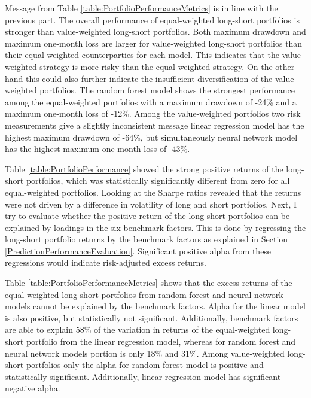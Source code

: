 \documentclass[12pt]{article}
\begin{document}
Message from Table \ref{table:PortfolioPerformanceMetrics} is in line with the previous part. The overall performance of equal-weighted long-short portfolios is stronger than value-weighted long-short portfolios. Both maximum drawdown and maximum one-month loss are larger for value-weighted long-short portfolios than their equal-weighted counterparties for each model. This indicates that the value-weighted strategy is more risky than the equal-weighted strategy. On the other hand this could also further indicate the insufficient diversification of the value-weighted portfolios. The random forest model shows the strongest performance among the equal-weighted portfolios with a maximum drawdown of -24\% and a maximum one-month loss of -12\%. Among the value-weighted portfolios two risk measurements give a slightly inconsistent message linear regression model has the highest maximum drawdown of -64\%, but simultaneously neural network model has the highest maximum one-month loss of -43\%. \par

Table \ref{table:PortfolioPerformance} showed the strong positive returns of the long-short portfolios, which was statistically significantly different from zero for all equal-weighted portfolios. Looking at the Sharpe ratios revealed that the returns were not driven by a difference in volatility of long and short portfolios. Next, I try to evaluate whether the positive return of the long-short portfolios can be explained by loadings in the six benchmark factors. This is done by regressing the long-short portfolio returns by the benchmark factors as explained in Section \ref{PredictionPerformanceEvaluation}. Significant positive alpha from these regressions would indicate risk-adjusted excess returns. \par

Table \ref{table:PortfolioPerformanceMetrics} shows that the excess returns of the equal-weighted long-short portfolios from random forest and neural network models cannot be explained by the benchmark factors. Alpha for the linear model is also positive, but statistically not significant. Additionally, benchmark factors are able to explain 58\% of the variation in returns of the equal-weighted long-short portfolio from the linear regression model, whereas for random forest and neural network models portion is only 18\% and 31\%. Among value-weighted long-short portfolios only the alpha for random forest model is positive and statistically significant. Additionally, linear regression model has significant negative alpha. \par
\end{document}
